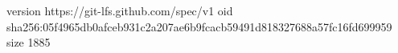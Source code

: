 version https://git-lfs.github.com/spec/v1
oid sha256:05f4965db0afceb931c2a207ae6b9fcacb59491d818327688a57fc16fd699959
size 1885
